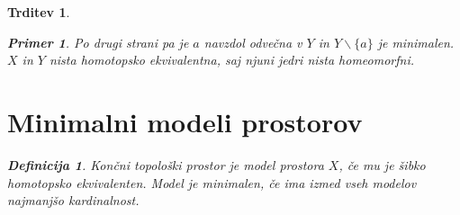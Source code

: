 \documentclass[a4paper,12pt]{article}
\theoremstyle{definition}
\newtheorem{definicija}{Definicija}
\theoremstyle{plain}
\theoremstyle{definition}
\newtheorem{primer}{Primer}
\theoremstyle{plain}
\newtheorem{trditev}{Trditev}
\theoremstyle{plain}
\theoremstyle{plain}
\theoremstyle{plain}
\newenvironment{dokaz}{\begin{proof}[\bfseries\upshape\proofname]}{\end{proof}}
\begin{document}
\begin{trditev}
\begin{primer}
Po drugi strani pa je $a$ navzdol odvečna v $Y$ in $Y\backslash \{a\}$ je minimalen. $X$ in $Y$ nista homotopsko ekvivalentna, saj njuni jedri nista homeomorfni.
\end{primer}


   
\section{Minimalni modeli prostorov}

\begin{definicija}
    Končni topološki prostor je \textit{model} prostora $X$, če mu je šibko homotopsko ekvivalenten. Model je \textit{minimalen}, če ima izmed vseh modelov najmanjšo kardinalnost.
\end{definicija}



\end{trditev}
\end{document}
